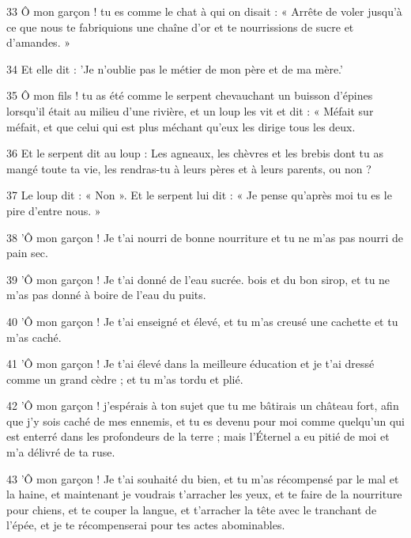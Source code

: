 \par 33 Ô mon garçon ! tu es comme le chat à qui on disait : « Arrête de voler jusqu'à ce que nous te fabriquions une chaîne d'or et te nourrissions de sucre et d'amandes. »

\par 34 Et elle dit : 'Je n'oublie pas le métier de mon père et de ma mère.'

\par 35 Ô mon fils ! tu as été comme le serpent chevauchant un buisson d'épines lorsqu'il était au milieu d'une rivière, et un loup les vit et dit : « Méfait sur méfait, et que celui qui est plus méchant qu'eux les dirige tous les deux.

\par 36 Et le serpent dit au loup : Les agneaux, les chèvres et les brebis dont tu as mangé toute ta vie, les rendras-tu à leurs pères et à leurs parents, ou non ?

\par 37 Le loup dit : « Non ». Et le serpent lui dit : « Je pense qu'après moi tu es le pire d'entre nous. »

\par 38 'Ô mon garçon ! Je t'ai nourri de bonne nourriture et tu ne m'as pas nourri de pain sec.

\par 39 'Ô mon garçon ! Je t'ai donné de l'eau sucrée. bois et du bon sirop, et tu ne m'as pas donné à boire de l'eau du puits.

\par 40 'Ô mon garçon ! Je t'ai enseigné et élevé, et tu m'as creusé une cachette et tu m'as caché.

\par 41 'Ô mon garçon ! Je t'ai élevé dans la meilleure éducation et je t'ai dressé comme un grand cèdre ; et tu m'as tordu et plié.

\par 42 'Ô mon garçon ! j'espérais à ton sujet que tu me bâtirais un château fort, afin que j'y sois caché de mes ennemis, et tu es devenu pour moi comme quelqu'un qui est enterré dans les profondeurs de la terre ; mais l'Éternel a eu pitié de moi et m'a délivré de ta ruse.

\par 43 'Ô mon garçon ! Je t'ai souhaité du bien, et tu m'as récompensé par le mal et la haine, et maintenant je voudrais t'arracher les yeux, et te faire de la nourriture pour chiens, et te couper la langue, et t'arracher la tête avec le tranchant de l'épée, et je te récompenserai pour tes actes abominables.

